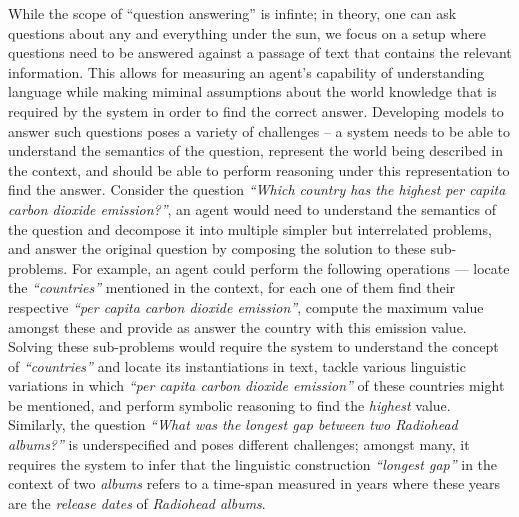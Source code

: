 \documentclass[main.tex]{subfiles}
\begin{document}
While the scope of ``question answering'' is infinte; in theory, one can ask questions about any and everything under the sun, we focus on a setup where questions need to be answered against a passage of text that contains the relevant information.  This allows for measuring an agent's capability of understanding language while making miminal assumptions about the world knowledge that is required by the system in order to find the correct answer.
Developing models to answer such questions poses a variety of challenges -- a system needs to be able to understand the semantics of the question, represent the world being described in the context, and should be able to perform reasoning under this representation to find the answer.
Consider the question \textit{``Which country has the highest per capita carbon dioxide emission?''}, an agent would need to understand the semantics of the question and decompose it into multiple simpler but interrelated problems, and answer the original question by composing the solution to these sub-problems.  For example, an agent could perform the following operations --- locate the \textit{``countries''} mentioned in the context, for each one of them find their respective \textit{``per capita carbon dioxide emission''}, compute the maximum value amongst these and provide as answer the country with this emission value.
Solving these sub-problems would require the system to understand the concept of \textit{``countries''} and locate its instantiations in text, tackle various linguistic variations in which \textit{``per capita carbon dioxide emission''} of these countries might be mentioned, and perform symbolic reasoning to find the \textit{highest} value.  Similarly, the question \textit{``What was the longest gap between two Radiohead albums?''} is underspecified and poses different challenges; amongst many, it requires the system to infer that the linguistic construction \textit{``longest gap''} in the context of two \textit{albums} refers to a time-span measured in years where these years are the \textit{release dates} of \textit{Radiohead albums}.
\end{document}

